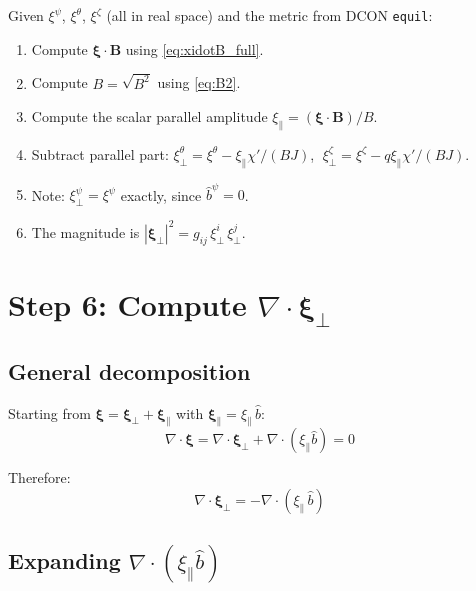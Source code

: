 \documentclass[12pt,a4paper]{article}
\newcommand{\bxi}{\boldsymbol{\xi}}
\begin{document}
\begin{tcolorbox}[colback=orange!5!white, colframe=orange!60!black, title=\textbf{Summary: Computing $\bxi_\perp$ in practice}]
Given $\xi^\psi$, $\xi^\theta$, $\xi^\zeta$ (all in real space) and the metric from DCON \texttt{equil}:
\begin{enumerate}
    \item Compute $\bxi\cdot\mathbf{B}$ using \eqref{eq:xidotB_full}.
    \item Compute $B = \sqrt{B^2}$ using \eqref{eq:B2}.
    \item Compute the scalar parallel amplitude $\xi_\parallel = (\bxi\cdot\mathbf{B})/B$.
    \item Subtract parallel part: $\xi^\theta_\perp = \xi^\theta - \xi_\parallel\chi'/(BJ)$, $\;\xi^\zeta_\perp = \xi^\zeta - q\xi_\parallel\chi'/(BJ)$.
    \item Note: $\xi^\psi_\perp = \xi^\psi$ exactly, since $\hat{b}^\psi = 0$.
    \item The magnitude is $|\bxi_\perp|^2 = g_{ij}\,\xi^i_\perp\,\xi^j_\perp$.
\end{enumerate}
\end{tcolorbox}

\section{Step 6: Compute $\nabla\cdot\bxi_\perp$}

\subsection{General decomposition}

Starting from $\bxi = \bxi_\perp + \bxi_\parallel$ with $\bxi_\parallel = \xi_\parallel\,\hat{b}$:
\begin{equation}
    \nabla\cdot\bxi = \nabla\cdot\bxi_\perp + \nabla\cdot(\xi_\parallel\hat{b}) = 0
\end{equation}

Therefore:
\begin{equation}
    \nabla\cdot\bxi_\perp = -\nabla\cdot(\xi_\parallel\,\hat{b})
    \label{eq:div_xiperp}
\end{equation}

\subsection{Expanding $\nabla\cdot(\xi_\parallel\hat{b})$}
\end{document}
